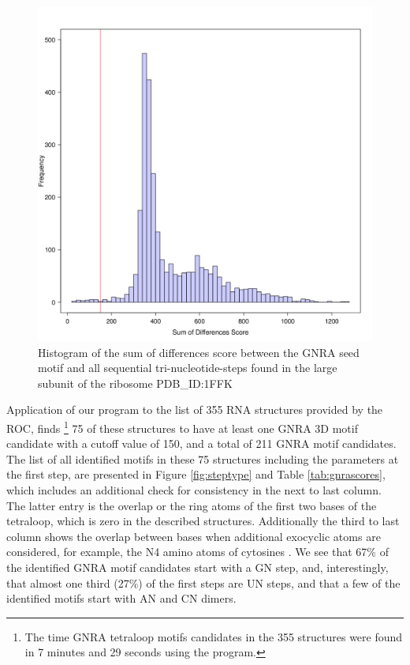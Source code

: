 \begin{figure}
\centering 
\includegraphics[angle=0, scale=0.5]{Chapter5/gnrahisto.png}
\caption{Histogram of  the sum of  differences score between  the GNRA
  seed  motif and  all  sequential tri-nucleotide-steps  found in  the
  large subunit of the ribosome PDB\_ID:1FFK}
\label{fig:gnrahist}
\end{figure}

Application of our program to  the list of 355 RNA structures provided
by the ROC, finds  \footnote{The time GNRA tetraloop motifs candidates
  in the 355  structures were found in 7 minutes  and 29 seconds using
  the program.}  75 of these structures  to have at least  one GNRA 3D
motif candidate  with a cutoff value of  150, and a total  of 211 GNRA
motif  candidates.  The  list of  all  identified motifs  in these  75
structures including  the parameters at the first  step, are presented
in  Figure \ref{fig:steptype}  and  Table \ref{tab:gnrascores},  which
includes  an additional  check for  consistency  in the  next to  last
column.  The  latter entry  is the  overlap or the  ring atoms  of the
first  two bases  of the  tetraloop, which  is zero  in  the described
structures.  Additionally  the third to last column  shows the overlap
between  bases when  additional  exocyclic atoms  are considered,  for
example, the N4  amino atoms of cytosines \cite{lu2003}.   We see that
67\% of  the identified  GNRA motif candidates  start with a  GN step,
and, interestingly,  that almost one  third (27\%) of the  first steps
are UN  steps, and that a few  of the identified motifs  start with AN
and CN dimers.

